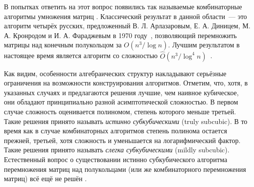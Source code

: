 В попытках ответить на этот вопрос появились так называемые комбинаторные алгоритмы умножения матриц%
%
.
Классический результат в данной области~--- это алгоритм четырёх русских, предложенный  В. Л. Арлазаровым, Е. А. Диницем, М. А. Кронродом и И. А. Фараджевым в 1970 году~\cite{ArlDinKro70}, позволяющий перемножить матрицы над конечным полукольцом за $O(n^3/\log n)$.
Лучшим результатом%
в настоящее время является алгоритм со сложностью%
 $\hat{O}(n^3/\log^4 n)$~\cite{10.1007/978-3-662-47672-7_89}.

Как видим, особенности алгебраических структур накладывают серьёзные ограничения на возможности конструирования алгоритмов.
Отметим, что, хотя, в указанных случаях и предлагаются решения лучшие, чем наивное кубическое, они обладают принципиально разной асимптотической сложностью.
В первом случае сложность оценивается полиномом, степень которого меньше третьей.
Такие решения принято называть \emph{истинно субкубическими} (truly subcubic).
В то время как в случае комбинаторных алгоритмов степень полинома остается прежней, третьей, хотя сложность и уменьшается на логарифмический фактор.
Такие решения принято называть \emph{слегка субкубическими} (mildly subcubic).
Естественный вопрос о существовании истинно субкубического алгоритма перемножения матриц над полукольцами (или же комбинаторного перемножения матриц) всё ещё не решён%
.

